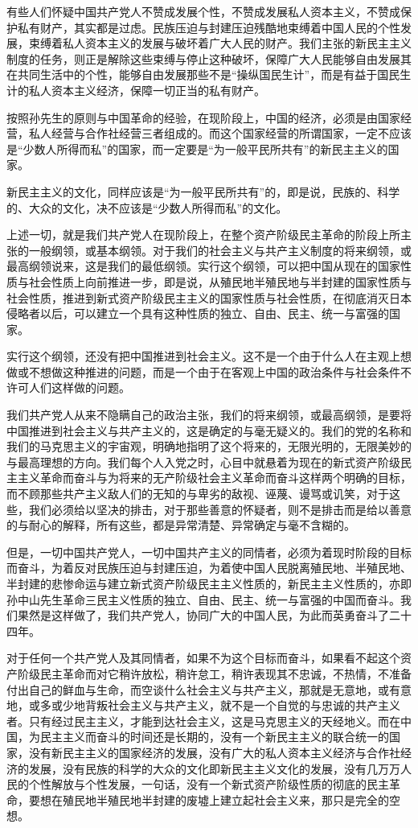 有些人们怀疑中国共产党人不赞成发展个性，不赞成发展私人资本主义，不赞成保护私有财产，其实都是过虑。民族压迫与封建压迫残酷地束缚着中国人民的个性发展，束缚着私人资本主义的发展与破坏着广大人民的财产。我们主张的新民主主义制度的任务，则正是解除这些束缚与停止这种破坏，保障广大人民能够自由发展其在共同生活中的个性，能够自由发展那些不是“操纵国民生计”，而是有益于国民生计的私人资本主义经济，保障一切正当的私有财产。

按照孙先生的原则与中国革命的经验，在现阶段上，中国的经济，必须是由国家经营，私人经营与合作社经营三者组成的。而这个国家经营的所谓国家，一定不应该是“少数人所得而私”的国家，而一定要是“为一般平民所共有”的新民主主义的国家。

新民主主义的文化，同样应该是“为一般平民所共有”的，即是说，民族的、科学的、大众的文化，决不应该是“少数人所得而私”的文化。

上述一切，就是我们共产党人在现阶段上，在整个资产阶级民主革命的阶段上所主张的一般纲领，或基本纲领。对于我们的社会主义与共产主义制度的将来纲领，或最高纲领说来，这是我们的最低纲领。实行这个纲领，可以把中国从现在的国家性质与社会性质上向前推进一步，即是说，从殖民地半殖民地与半封建的国家性质与社会性质，推进到新式资产阶级民主主义的国家性质与社会性质，在彻底消灭日本侵略者以后，可以建立一个具有这种性质的独立、自由、民主、统一与富强的国家。

实行这个纲领，还没有把中国推进到社会主义。这不是一个由于什么人在主观上想做或不想做这种推进的问题，而是一个由于在客观上中国的政治条件与社会条件不许可人们这样做的问题。

我们共产党人从来不隐瞒自己的政治主张，我们的将来纲领，或最高纲领，是要将中国推进到社会主义与共产主义的，这是确定的与毫无疑义的。我们的党的名称和我们的马克思主义的宇宙观，明确地指明了这个将来的，无限光明的，无限美妙的与最高理想的方向。我们每个人入党之时，心目中就悬着为现在的新式资产阶级民主主义革命而奋斗与为将来的无产阶级社会主义革命而奋斗这样两个明确的目标，而不顾那些共产主义敌人们的无知的与卑劣的敌视、诬蔑、谩骂或讥笑，对于这些，我们必须给以坚决的排击，对于那些善意的怀疑者，则不是排击而是给以善意的与耐心的解释，所有这些，都是异常清楚、异常确定与毫不含糊的。

但是，一切中国共产党人，一切中国共产主义的同情者，必须为着现时阶段的目标而奋斗，为着反对民族压迫与封建压迫，为着使中国人民脱离殖民地、半殖民地、半封建的悲惨命运与建立新式资产阶级民主主义性质的，新民主主义性质的，亦即孙中山先生革命三民主义性质的独立、自由、民主、统一与富强的中国而奋斗。我们果然是这样做了，我们共产党人，协同广大的中国人民，为此而英勇奋斗了二十四年。

对于任何一个共产党人及其同情者，如果不为这个目标而奋斗，如果看不起这个资产阶级民主革命而对它稍许放松，稍许怠工，稍许表现其不忠诚，不热情，不准备付出自己的鲜血与生命，而空谈什么社会主义与共产主义，那就是无意地，或有意地，或多或少地背叛社会主义与共产主义，就不是一个自觉的与忠诚的共产主义者。只有经过民主主义，才能到达社会主义，这是马克思主义的天经地义。而在中国，为民主主义而奋斗的时间还是长期的，没有一个新民主主义的联合统一的国家，没有新民主主义的国家经济的发展，没有广大的私人资本主义经济与合作社经济的发展，没有民族的科学的大众的文化即新民主主义文化的发展，没有几万万人民的个性解放与个性发展，一句话，没有一个新式资产阶级性质的彻底的民主革命，要想在殖民地半殖民地半封建的废墟上建立起社会主义来，那只是完全的空想。

